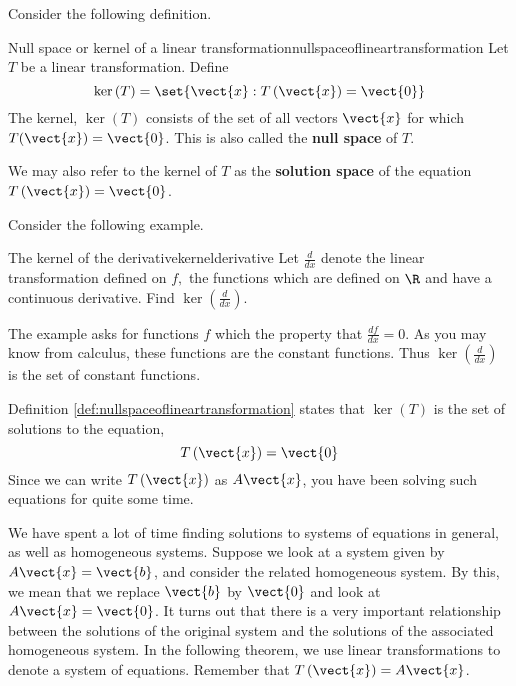 Consider the following definition.

\begin{definition}{Null space or kernel of a linear transformation}{nullspaceoflineartransformation}
Let $T$ be a linear transformation. Define
\begin{equation*}
\ker \left( T\right) = \set{\vect{x}:T \left(\vect{x} \right)= \vect{0} } 
\end{equation*}
The kernel, $\ker \left( T\right) $ consists of the set of all vectors $\vect{x}$ for which
$T (\vect{x}) = \vect{0}$. This is also called the
\textbf{null space} of $T$. 
\end{definition}

We may also refer to the kernel of $T$ as the
\textbf{solution space} of the equation $T \left(\vect{x}\right) = \vect{0}$.


Consider the following example.

\begin{example}{The kernel of the derivative}{kernelderivative}
Let $\frac{d}{dx}$ denote the linear transformation defined on $f,$ the functions
which are defined on $\R$ and have a continuous derivative. Find 
$\ker \left( \frac{d}{dx}\right) .$
\end{example}

\begin{solution} The example asks for functions $f$ which the property that $\frac{df}{dx}
=0. $ As you may know from calculus, these functions are the constant functions.
Thus $\ker \left( \frac{d}{dx}\right)$ is the set of constant functions.
\end{solution} 

Definition \ref{def:nullspaceoflineartransformation} states that $\ker \left( T\right) $ is the set of
solutions to the equation,
\begin{equation*}
T\left( \vect{x} \right) = \vect{0}
\end{equation*}
Since we can write $T\left( \vect{x} \right)$ as $A\vect{x}$, you have been solving such
equations for quite some time.

We have spent a lot of time finding solutions to systems of equations in general, as well as
homogeneous systems. Suppose we look at a system given by $A\vect{x}=\vect{b}$, and consider the 
related homogeneous system. By this, we mean that we replace $\vect{b}$ by $\vect{0}$ and look at $A\vect{x}=\vect{0}$. 
It turns out that there is a very important relationship between the solutions of the original
system and the solutions of the associated homogeneous system. In the following 
theorem, we use linear transformations to denote a system of equations. Remember that
$T\left(\vect{x}\right) = A\vect{x}$.

